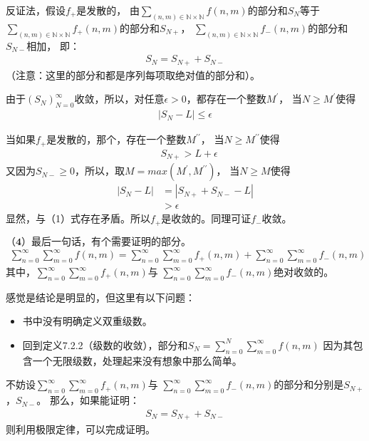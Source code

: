 \documentclass{article}
\begin{document}
反证法，假设$f_{+}$是发散的，
由$\sum \limits_{(n,m) \in \mathbb{N} \times \mathbb{N}}f(n,m)$的部分和$S_N$等于
$\sum \limits_{(n,m) \in \mathbb{N} \times \mathbb{N}}f_{+}(n,m)$的部分和$S_{N+}$，
$\sum \limits_{(n,m) \in \mathbb{N} \times \mathbb{N}}f_{-}(n,m)$的部分和$S_{N-}$相加，
即：
\begin{align*}
    S_N = S_{N+} + S_{N-}
\end{align*}
（注意：这里的部分和都是序列每项取绝对值的部分和）。

由于$(S_N)_{N=0}^\infty$收敛，所以，对任意$\epsilon > 0$，都存在一个整数$M^\prime$，
当$N \geq M^\prime$使得
\begin{align}
    |S_N - L| \leq \epsilon
\end{align}

当如果$f_{+}$是发散的，那个，存在一个整数$M^{\prime\prime}$，
当$N \geq M^{\prime\prime}$使得
\begin{align*}
     & S_{N+} > L + \epsilon
\end{align*}
又因为$S_{N-} \geq 0$，所以，取$M = max(M^\prime, M^{\prime\prime})$，
当$N \geq M$使得
\begin{align*}
    |S_N - L| & = |S_{N+} + S_{N-} - L | \\
              & > \epsilon
\end{align*}
显然，与（1）式存在矛盾。所以$f_{+}$是收敛的。同理可证$f_{-}$收敛。

$\textbf{（4）最后一句话，有个需要证明的部分。}$
\begin{align*}
    \sum \limits_{n=0}^\infty \sum \limits_{m=0}^\infty f(n,m)
    = \sum \limits_{n=0}^\infty \sum \limits_{m=0}^\infty f_{+}(n,m)
    +
    \sum \limits_{n=0}^\infty \sum \limits_{m=0}^\infty f_{-}(n,m)
\end{align*}
其中，$\sum \limits_{n=0}^\infty \sum \limits_{m=0}^\infty f_{+}(n,m)$与
$ \sum \limits_{n=0}^\infty \sum \limits_{m=0}^\infty f_{-}(n,m)$绝对收敛的。

感觉是结论是明显的，但这里有以下问题：
\begin{itemize}
    \item 书中没有明确定义双重级数。
    \item 回到定义7.2.2（级数的收敛），部分和$S_N = \sum \limits_{n=0}^N \sum \limits_{m=0}^\infty f(n,m)$
          因为其包含一个无限级数，处理起来没有想象中那么简单。
\end{itemize}
不妨设$\sum \limits_{n=0}^\infty \sum \limits_{m=0}^\infty f_{+}(n,m)$与
$ \sum \limits_{n=0}^\infty \sum \limits_{m=0}^\infty f_{-}(n,m)$的部分和分别是$S_{N+}$，$S_{N-}$。
那么，如果能证明：
\begin{align*}
    S_N = S_{N+} + S_{N-}
\end{align*}
则利用极限定律，可以完成证明。
\end{document}
